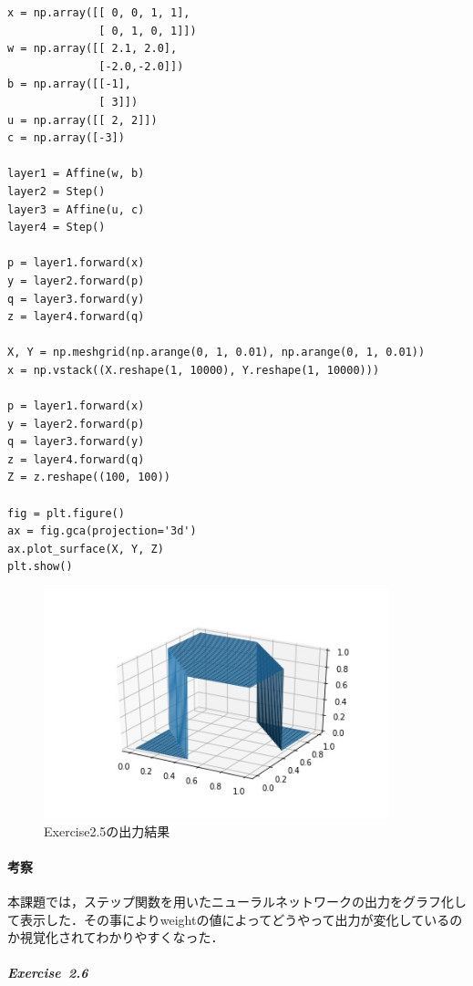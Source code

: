 \documentclass[11pt, a4paper]{jsarticle}
\begin{document}
  \begin{lstlisting}[caption=Exercise~2.5, label=src:exercise2.5]
x = np.array([[ 0, 0, 1, 1],
              [ 0, 1, 0, 1]])
w = np.array([[ 2.1, 2.0],
              [-2.0,-2.0]])
b = np.array([[-1],
              [ 3]])
u = np.array([[ 2, 2]])
c = np.array([-3])

layer1 = Affine(w, b)
layer2 = Step()
layer3 = Affine(u, c)
layer4 = Step()

p = layer1.forward(x)
y = layer2.forward(p)
q = layer3.forward(y)
z = layer4.forward(q)

X, Y = np.meshgrid(np.arange(0, 1, 0.01), np.arange(0, 1, 0.01))
x = np.vstack((X.reshape(1, 10000), Y.reshape(1, 10000)))

p = layer1.forward(x)
y = layer2.forward(p)
q = layer3.forward(y)
z = layer4.forward(q)
Z = z.reshape((100, 100))

fig = plt.figure()
ax = fig.gca(projection='3d')
ax.plot_surface(X, Y, Z)
plt.show()
  \end{lstlisting}

  \begin{figure}[h]
    \centering
    \includegraphics[width=10cm]{./images/exercise2.5.jpg}
    \caption{Exercise2.5の出力結果}
    \label{fig:exercise2.5}
  \end{figure}

  \paragraph{ 考察}
  本課題では，ステップ関数を用いたニューラルネットワークの出力をグラフ化して表示した．その事によりweightの値によってどうやって出力が変化しているのか視覚化されてわかりやすくなった．

  \subparagraph{Exercise~2.6}
\end{document}
